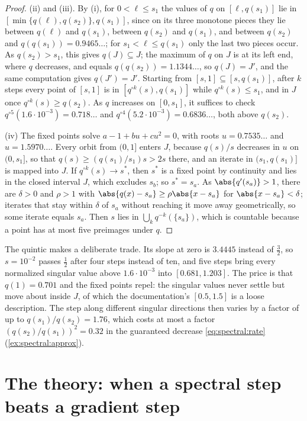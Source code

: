 \begin{refsection}
\begin{proof}
(ii) and (iii). By (i), for $0<\ell\le s_1$ the values of $q$ on $[\ell,q(s_1)]$ lie in $[\min\{q(\ell),q(s_2)\},q(s_1)]$, since on its three monotone pieces they lie between $q(\ell)$ and $q(s_1)$, between $q(s_2)$ and $q(s_1)$, and between $q(s_2)$ and $q(q(s_1))=0.9465\ldots$; for $s_1<\ell\le q(s_1)$ only the last two pieces occur. As $q(s_2)>s_1$, this gives $q(J)\subseteq J$; the maximum of $q$ on $J$ is at its left end, where $q$ decreases, and equals $q(q(s_2))=1.1344\ldots$, so $q(J)=J'$, and the same computation gives $q(J')=J'$. Starting from $[s,1]\subseteq[s,q(s_1)]$, after $k$ steps every point of $[s,1]$ is in $[q^{\circ k}(s),q(s_1)]$ while $q^{\circ k}(s)\le s_1$, and in $J$ once $q^{\circ k}(s)\ge q(s_2)$. As $q$ increases on $[0,s_1]$, it suffices to check $q^{\circ5}(1.6\cdot10^{-3})=0.718\ldots$ and $q^{\circ4}(5.2\cdot10^{-3})=0.6836\ldots$, both above $q(s_2)$.

(iv) The fixed points solve $a-1+bu+cu^2=0$, with roots $u=0.7535\ldots$ and $u=1.5970\ldots$. Every orbit from $(0,1]$ enters $J$, because $q(s)/s$ decreases in $u$ on $(0,s_1]$, so that $q(s)\ge(q(s_1)/s_1)s>2s$ there, and an iterate in $(s_1,q(s_1)]$ is mapped into $J$. If $q^{\circ k}(s)\to s^*$, then $s^*$ is a fixed point by continuity and lies in the closed interval $J$, which excludes $s_b$; so $s^*=s_a$. As $\abs{q'(s_a)}>1$, there are $\delta>0$ and $\rho>1$ with $\abs{q(x)-s_a}\ge\rho\abs{x-s_a}$ for $\abs{x-s_a}<\delta$; iterates that stay within $\delta$ of $s_a$ without reaching it move away geometrically, so some iterate equals $s_a$. Then $s$ lies in $\bigcup_kq^{-k}(\{s_a\})$, which is countable because a point has at most five preimages under $q$.
\end{proof}

The quintic makes a deliberate trade. Its slope at zero is $3.4445$ instead of $\frac32$, so $s=10^{-2}$ passes $\frac12$ after four steps instead of ten, and five steps bring every normalized singular value above $1.6\cdot10^{-3}$ into $[0.681,1.203]$. The price is that $q(1)=0.701$ and the fixed points repel: the singular values never settle but move about inside $J$, of which the documentation's $[0.5,1.5]$ is a loose description. The step along different singular directions then varies by a factor of up to $q(s_1)/q(s_2)=1.76$, which costs at most a factor $(q(s_2)/q(s_1))^2=0.32$ in the guaranteed decrease \eqref{eq:spectral:rate} (\cref{ex:spectral:approx}).

\section{The theory: when a spectral step beats a gradient step}\label{sec:spectral:whenhelps}


\end{refsection}
